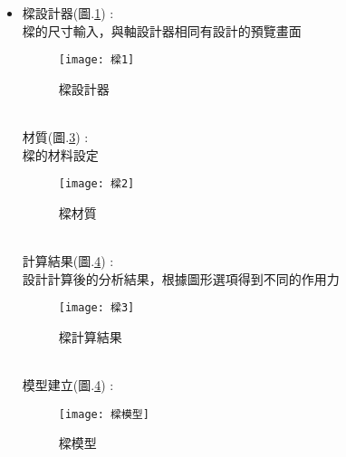 \begin{itemize}
	\item 樑設計器(圖.\ref{2.71}) :\\
		樑的尺寸輸入，與軸設計器相同有設計的預覽畫面\\
		\begin{figure}[hbt!]
		\begin{center}
		\texttt{[image: 樑1]}
		\caption{\Large 樑設計器}\label{2.71}
		\end{center}
		\end{figure}
		\\
		材質(圖.\ref{2.72}) :\\
		樑的材料設定\\
		\begin{figure}[hbt!]
		\begin{center}
		\texttt{[image: 樑2]}
		\caption{\Large 樑材質}\label{2.72}
		\end{center}
		\end{figure}
		\\
		計算結果(圖.\ref{2.73}) :\\
		設計計算後的分析結果，根據圖形選項得到不同的作用力\\
		\begin{figure}[hbt!]
		\begin{center}
		\texttt{[image: 樑3]}
		\caption{\Large 樑計算結果}\label{2.72}
		\end{center}
		\end{figure}
		\\
		模型建立(圖.\ref{2.73}) :\\
		\begin{figure}[hbt!]
		\begin{center}
		\texttt{[image: 樑模型]}
		\caption{\Large 樑模型}\label{2.73}
		\end{center}
		\end{figure}
		\\
		

\end{itemize}
